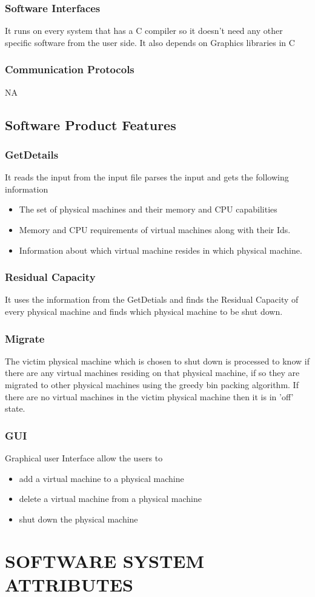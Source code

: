 \documentclass{article}
\begin{document}
			\subsubsection{Software Interfaces}
			It runs on every system that has a C compiler so it doesn't need any other specific software from the user side. It 				also depends on Graphics libraries in C 
			\subsubsection{Communication Protocols}
			NA
		\subsection{Software Product Features}
			\subsubsection {GetDetails}
			It reads the input from the input file parses the input and gets the following information
			\begin{itemize}
				\item The set of physical machines and their memory and CPU capabilities
				\item Memory and CPU requirements of virtual machines along with their Ids.
				\item Information about which virtual machine resides in which physical machine.
			\end{itemize}
			\subsubsection{Residual Capacity}
			It uses the information from the GetDetials and finds the Residual Capacity of every physical machine and finds which 				physical machine to be shut down.
			\subsubsection{Migrate}
			The victim physical machine which is chosen to shut down is processed to know if there are any virtual machines 			residing on that physical machine, if so they are migrated to other physical machines using the greedy bin packing 				algorithm. If there are no virtual machines in the victim physical machine then it is in 'off' state.
			\subsubsection{GUI}
			Graphical user Interface allow the users to
			\begin{itemize}
				\item add a virtual machine to a physical machine
				\item delete a virtual machine from a physical machine
				\item shut down the physical machine
			\end{itemize}
	\section{SOFTWARE SYSTEM ATTRIBUTES}
\end{document}

